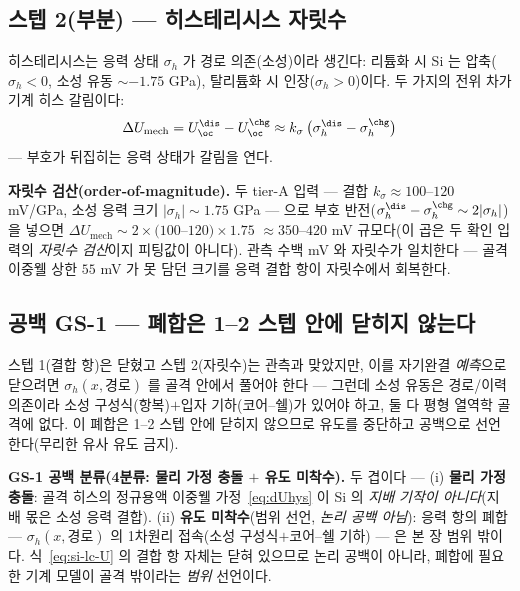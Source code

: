 \subsection{스텝 2(부분) --- 히스테리시스 자릿수}\label{ssec:mech-scale}
히스테리시스는 응력 상태 $\sigma_h$ 가 경로 의존(소성)이라 생긴다: 리튬화 시 Si 는 압축($\sigma_h<0$,
소성 유동 $\sim-1.75$ GPa\cite{sethuraman_stressevo2010}), 탈리튬화 시 인장($\sigma_h>0$)이다. 두 가지의
전위 차가 기계 히스 갈림이다:
\begin{equation}
\Delta U_\mathrm{mech}=U_\oc^{\dis}-U_\oc^{\chg}
\approx k_\sigma\,\bigl(\sigma_h^{\dis}-\sigma_h^{\chg}\bigr)
\label{eq:si-lc-hys}
\end{equation}
--- 부호가 뒤집히는 응력 상태가 갈림을 연다.

\begin{verifybox}
\textbf{자릿수 검산(order-of-magnitude).} 두 tier-A 입력 --- 결합 $k_\sigma\approx100$--$120$
mV/GPa\cite{sethuraman_stresspot2010}, 소성 응력 크기 $|\sigma_h|\sim1.75$ GPa\cite{sethuraman_stressevo2010}
--- 으로 부호 반전($\sigma_h^{\dis}-\sigma_h^{\chg}\sim2|\sigma_h|$)을 넣으면 $\Delta U_\mathrm{mech}\sim2\times(100$--$120)\times1.75$
$\approx350$--$420$ mV 규모다(이 곱은 두 확인 입력의 \emph{자릿수 검산}이지 피팅값이 아니다). 관측 수백
mV\cite{obrovac_chevrier2014} 와 자릿수가 일치한다 --- 골격 이중웰 상한 $55$ mV 가 못 담던 크기를 응력
결합 항이 자릿수에서 회복한다.
\end{verifybox}

\subsection{공백 GS-1 --- 폐합은 1--2 스텝 안에 닫히지 않는다}\label{ssec:mech-gap}
스텝 1(결합 항)은 닫혔고 스텝 2(자릿수)는 관측과 맞았지만, 이를 자기완결 \emph{예측}으로 닫으려면
$\sigma_h(x,\text{경로})$ 를 골격 안에서 풀어야 한다 --- 그런데 소성 유동은 경로/이력 의존이라 소성
구성식(항복)$+$입자 기하(코어--쉘)가 있어야 하고, 둘 다 평형 열역학 골격에 없다. 이 폐합은 1--2 스텝
안에 닫히지 않으므로 유도를 중단하고 공백으로 선언한다(무리한 유사 유도 금지).

\begin{warnbox}
\textbf{GS-1 공백 분류(4분류: 물리 가정 충돌 $+$ 유도 미착수).} 두 겹이다 --- (i) \textbf{물리 가정 충돌}:
골격 히스의 정규용액 이중웰 가정~\eqref{eq:dUhys} 이 Si 의 \emph{지배 기작이 아니다}(지배 몫은 소성
응력 결합). (ii) \textbf{유도 미착수}(범위 선언, \emph{논리 공백 아님}): 응력 항의 폐합 --- $\sigma_h(x,\text{경로})$
의 1차원리 접속(소성 구성식$+$코어--쉘 기하) --- 은 본 장 범위 밖이다. 식~\eqref{eq:si-lc-U} 의 결합 항
자체는 닫혀 있으므로 논리 공백이 아니라, 폐합에 필요한 기계 모델이 골격 밖이라는 \emph{범위} 선언이다.
\end{warnbox}

